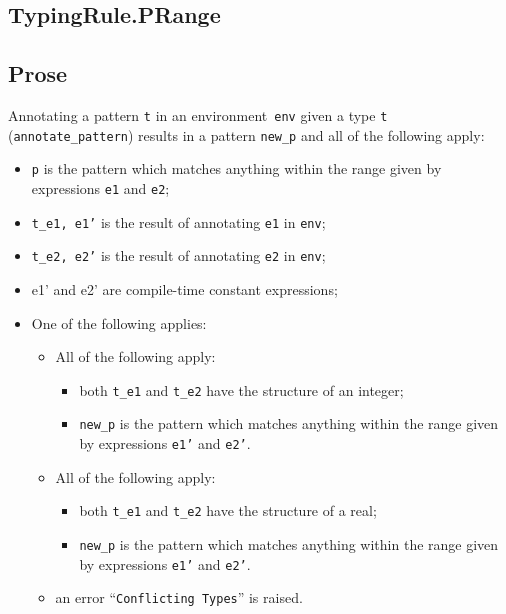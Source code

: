 \documentclass{book}
\begin{document}
\begin{itemize}

\section{TypingRule.PRange \label{sec:TypingRule.PRange}}

    \subsection{Prose}
   Annotating a pattern \texttt{t} in an environment~\texttt{env} given a type \texttt{t} (\texttt{annotate\_pattern}) results in a pattern \texttt{new\_p} and all of the following apply:
   \begin{itemize}
   \item \texttt{p} is the pattern which matches anything within the range given by
      expressions \texttt{e1} and \texttt{e2};
   \item \texttt{t\_e1, e1'} is the result of annotating \texttt{e1} in \texttt{env};
   \item \texttt{t\_e2, e2'} is the result of annotating \texttt{e2} in \texttt{env};
   \item e1' and e2' are compile-time constant expressions;
   \item One of the following applies:
     \begin{itemize}
     \item All of the following apply:
           \begin{itemize}
           \item both \texttt{t\_e1} and \texttt{t\_e2} have the structure of an integer;
           \item \texttt{new\_p} is the pattern which matches anything within the range given by
      expressions \texttt{e1'} and \texttt{e2'}.
           \end{itemize}
     \item All of the following apply:
           \begin{itemize}
           \item both \texttt{t\_e1} and \texttt{t\_e2} have the structure of a real;
           \item \texttt{new\_p} is the pattern which matches anything within the range given by
      expressions \texttt{e1'} and \texttt{e2'}.
           \end{itemize}
     \item an error ``\texttt{Conflicting Types}'' is raised.
     \end{itemize}
   \end{itemize}


\end{itemize}
\end{document}
